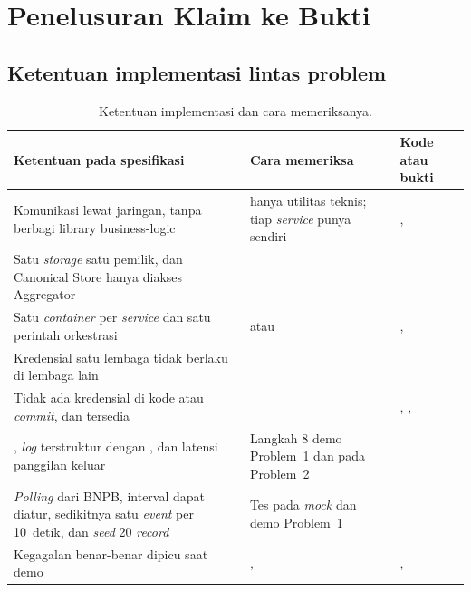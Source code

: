 \appendix
\chapter{Penelusuran Klaim ke Bukti}

\section{Ketentuan implementasi lintas problem}

\begin{table}[H]
\centering\small
\begin{tabularx}{\textwidth}{@{}L{4.6cm}L{3.8cm}Y@{}}
\toprule
\textbf{Ketentuan pada spesifikasi} & \textbf{Cara memeriksa} & \textbf{Kode atau bukti}\\
\midrule
Komunikasi lewat jaringan, tanpa berbagi library business-logic &  hanya utilitas teknis; tiap \emph{service} punya  sendiri & , \\
Satu \emph{storage} satu pemilik, dan Canonical Store hanya diakses Aggregator &  & \\
Satu \emph{container} per \emph{service} dan satu perintah orkestrasi &  atau  & , \\
Kredensial satu lembaga tidak berlaku di lembaga lain &  & \\
Tidak ada kredensial di kode atau \emph{commit}, dan  tersedia &  & , , \\
, \emph{log} terstruktur dengan , dan latensi panggilan keluar & Langkah 8 demo Problem~1 dan  pada Problem~2 & \\
\emph{Polling} dari BNPB, interval dapat diatur, sedikitnya satu \emph{event} per 10~detik, dan \emph{seed} 20 \emph{record} & Tes pada \emph{mock} dan demo Problem~1 & \\
Kegagalan benar-benar dipicu saat demo & ,  & , \\
\bottomrule
\end{tabularx}
\caption{Ketentuan implementasi dan cara memeriksanya.}
\end{table}

